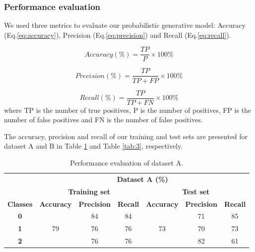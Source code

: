 \documentclass{article}
\begin{document}
\subsubsection{Performance evaluation}

We used three metrics to evaluate our probabilistic generative model: Accuracy (Eq.\eqref{eq:accuracy}), Precision (Eq.\eqref{eq:precision}) and Recall (Eq.\eqref{eq:recall}).

\begin{equation}
\label{eq:accuracy}
Accuracy (\%) = \dfrac{TP}{P} \times 100\%
\end{equation}

\begin{equation}
  \label{eq:precision}
  Precision (\%) = \dfrac{TP}{TP+FP} \times 100\%
\end{equation}

\begin{equation}
  \label{eq:recall}
  Recall (\%) = \dfrac{TP}{TP+FN} \times 100\%
\end{equation}
where TP is the number of true positives, P is the number of positives, FP is the number of false positives and FN is the number of false positives.

The accuracy, precision and recall of our training and test sets are presented for dataset A and B in Table \ref{tab:2} and Table \ref{tab:3}, respectively.

\begin{table}[h]
  \centering
  \caption{Performance evaluation of dataset A.} \label{tab:2}
  \begin{tabular}{ccccccc}
  \cline{2-7}
   & \multicolumn{6}{c}{\textbf{Dataset A (\%)}} \\ \cline{2-7}
   & \multicolumn{3}{c}{\textbf{Training set}} & \multicolumn{3}{c}{\textbf{Test set}} \\ \hline
  \textbf{Classes} & \textbf{Accuracy} & \textbf{Precision} & \textbf{Recall} & \textbf{Accuracy} & \textbf{Precision} & \textbf{Recall} \\ \hline
  \textbf{0} & \multirow{3}{*}{79} & 84 & 84 & \multirow{3}{*}{73} & 71 & 85 \\ \cline{1-1} \cline{3-4} \cline{6-7} 
  \textbf{1} &  & 76 & 76 &  & 70 & 73 \\ \cline{1-1} \cline{3-4} \cline{6-7} 
  \textbf{2} &  & 76 & 76 &  & 82 & 61 \\ \hline
  \end{tabular}
\end{table}
\end{document}
